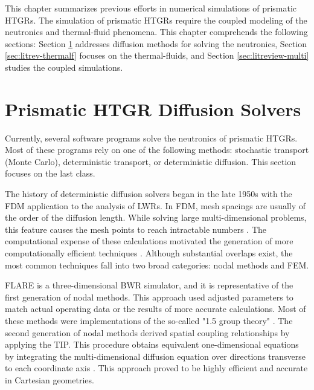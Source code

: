 This chapter summarizes previous efforts in numerical simulations of prismatic HTGRs.
The simulation of prismatic HTGRs require the coupled modeling of the neutronics and thermal-fluid phenomena.
This chapter comprehends the following sections: Section \ref{sec:litreview-neut} addresses diffusion methods for solving the neutronics, Section \ref{sec:litrev-thermalf} focuses on the thermal-fluids, and Section \ref{sec:litreview-multi} studies the coupled simulations.

\section{Prismatic HTGR Diffusion Solvers}
\label{sec:litreview-neut}

Currently, several software programs solve the neutronics of prismatic \glspl{HTGR}.
Most of these programs rely on one of the following methods: stochastic transport (Monte Carlo), deterministic transport, or deterministic diffusion.
This section focuses on the last class.

The history of deterministic diffusion solvers began in the late 1950s with the \gls{FDM} application to the analysis of \glspl{LWR}.
In \gls{FDM}, mesh spacings are usually of the order of the diffusion length.
While solving large multi-dimensional problems, this feature causes the mesh points to reach intractable numbers \cite{lewis_finite_1986}.
The computational expense of these calculations motivated the generation of more computationally efficient techniques \cite{lawrence_progress_1986}.
Although substantial overlaps exist, the most common techniques fall into two broad categories: nodal methods and \gls{FEM}.

FLARE \cite{delp_flare_1964} is a three-dimensional \gls{BWR} simulator, and it is representative of the first generation of nodal methods.
This approach used adjusted parameters to match actual operating data or the results of more accurate calculations.
Most of these methods were implementations of the so-called "1.5 group theory" \cite{gupta_nodal_1981}.
The second generation of nodal methods derived spatial coupling relationships by applying the \gls{TIP}.
This procedure obtains equivalent one-dimensional equations by integrating the multi-dimensional diffusion equation over directions transverse to each coordinate axis \cite{lawrence_progress_1986}.
This approach proved to be highly efficient and accurate in Cartesian geometries.

